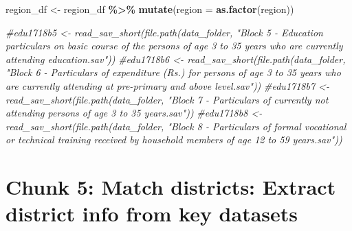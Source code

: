 \documentclass[
]{article}
\newenvironment{Shaded}{\begin{snugshade}}{\end{snugshade}}
\newcommand{\AttributeTok}[1]{\textcolor[rgb]{0.13,0.29,0.53}{#1}}
\newcommand{\CommentTok}[1]{\textcolor[rgb]{0.56,0.35,0.01}{\textit{#1}}}
\newcommand{\FunctionTok}[1]{\textcolor[rgb]{0.13,0.29,0.53}{\textbf{#1}}}
\newcommand{\NormalTok}[1]{#1}
\newcommand{\OtherTok}[1]{\textcolor[rgb]{0.56,0.35,0.01}{#1}}
\newcommand{\SpecialCharTok}[1]{\textcolor[rgb]{0.81,0.36,0.00}{\textbf{#1}}}
\begin{document}
\begin{Shaded}
\begin{Highlighting}[]
\NormalTok{region\_df }\OtherTok{\textless{}{-}}\NormalTok{ region\_df }\SpecialCharTok{\%\textgreater{}\%} 
  \FunctionTok{mutate}\NormalTok{(}\AttributeTok{region =} \FunctionTok{as.factor}\NormalTok{(region))}









\CommentTok{\#edu1718b5  \textless{}{-} read\_sav\_short(file.path(data\_folder, "Block 5 {-} Education particulars on basic course of the persons of age 3 to 35 years who are currently attending education.sav"))}
\CommentTok{\#edu1718b6  \textless{}{-} read\_sav\_short(file.path(data\_folder, "Block 6 {-} Particulars of expenditure (Rs.) for persons of age 3 to 35 years who are currently attending at pre{-}primary and above level.sav"))}
\CommentTok{\#edu1718b7  \textless{}{-} read\_sav\_short(file.path(data\_folder, "Block 7 {-} Particulars of currently not attending persons of age 3 to 35 years.sav"))}
\CommentTok{\#edu1718b8  \textless{}{-} read\_sav\_short(file.path(data\_folder, "Block 8 {-} Particulars of formal vocational or technical training received by household members of age 12 to 59 years.sav"))}
\end{Highlighting}
\end{Shaded}

\section*{Chunk 5: Match districts: Extract district info from key datasets}\label{chunk-5-match-districts-extract-district-info-from-key-datasets}
\end{document}
